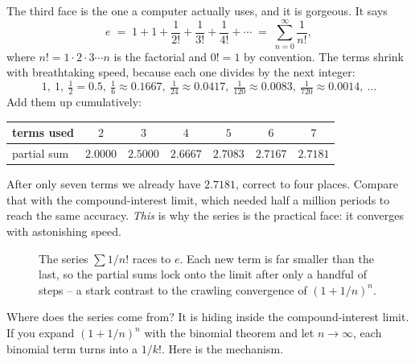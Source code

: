 The third face is the one a computer actually uses, and it is gorgeous. It says
\[
e \;=\; 1 + 1 + \frac{1}{2!} + \frac{1}{3!} + \frac{1}{4!} + \cdots
   \;=\; \sum_{n=0}^{\infty} \frac{1}{n!},
\]
where $n! = 1\cdot 2\cdot 3\cdots n$ is the factorial and $0!=1$ by convention. The terms shrink with breathtaking speed, because each one divides by the next integer:
\[
1,\ 1,\ \tfrac{1}{2}=0.5,\ \tfrac{1}{6}\approx0.1667,\ \tfrac{1}{24}\approx0.0417,\ \tfrac{1}{120}\approx0.0083,\ \tfrac{1}{720}\approx0.0014,\ \ldots
\]
Add them up cumulatively:
\begin{center}
\begin{tabular}{@{}lcccccc@{}}
\toprule
terms used & $2$ & $3$ & $4$ & $5$ & $6$ & $7$ \\
\midrule
partial sum & $2.0000$ & $2.5000$ & $2.6667$ & $2.7083$ & $2.7167$ & $2.7181$ \\
\bottomrule
\end{tabular}
\end{center}
After only seven terms we already have $2.7181$, correct to four places. Compare that with the compound-interest limit, which needed half a million periods to reach the same accuracy. \emph{This} is why the series is the practical face: it converges with astonishing speed.

\begin{figure}[H]
\centering
{}
\caption{The series $\sum 1/n!$ races to $e$. Each new term is far smaller than the last, so the partial sums lock onto the limit after only a handful of steps -- a stark contrast to the crawling convergence of $(1+1/n)^n$.}
\label{ch03:fig-series}
\end{figure}

Where does the series come from? It is hiding inside the compound-interest limit. If you expand $(1+1/n)^n$ with the binomial theorem and let $n\to\infty$, each binomial term turns into a $1/k!$. Here is the mechanism.

